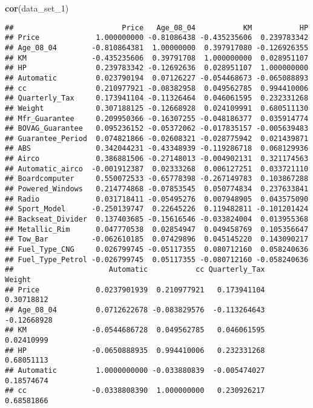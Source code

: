 \documentclass[]{article}
\newenvironment{Shaded}{\begin{snugshade}}{\end{snugshade}}
\newcommand{\DecValTok}[1]{\textcolor[rgb]{0.00,0.00,0.81}{#1}}
\newcommand{\KeywordTok}[1]{\textcolor[rgb]{0.13,0.29,0.53}{\textbf{#1}}}
\newcommand{\NormalTok}[1]{#1}
\begin{document}
\begin{Shaded}
\begin{Highlighting}[]
\KeywordTok{cor}\NormalTok{(data_set_}\DecValTok{1}\NormalTok{)}
\end{Highlighting}
\end{Shaded}

\begin{verbatim}
##                         Price   Age_08_04           KM           HP
## Price             1.000000000 -0.81086438 -0.435235606  0.239783342
## Age_08_04        -0.810864381  1.00000000  0.397917080 -0.126926355
## KM               -0.435235606  0.39791708  1.000000000  0.028951107
## HP                0.239783342 -0.12692636  0.028951107  1.000000000
## Automatic         0.023790194  0.07126227 -0.054468673 -0.065088893
## cc                0.210977921 -0.08382958  0.049562785  0.994410006
## Quarterly_Tax     0.173941104 -0.11326464  0.046061595  0.232331268
## Weight            0.307188125 -0.12668928  0.024109991  0.680511130
## Mfr_Guarantee     0.209950366 -0.16307255 -0.048186377  0.035914774
## BOVAG_Guarantee   0.095236152 -0.05372062 -0.017835157 -0.005639483
## Guarantee_Period  0.074821866 -0.02608321 -0.028775942  0.021439871
## ABS               0.342044231 -0.43348939 -0.119286718  0.068129936
## Airco             0.386881506 -0.27148013 -0.004902131  0.321174563
## Automatic_airco  -0.001912387  0.02333268  0.006127251  0.033721110
## Boardcomputer     0.550072533 -0.65778398 -0.267149783  0.103867288
## Powered_Windows   0.214774868 -0.07853545  0.050774834  0.237633841
## Radio             0.031718411 -0.05495276  0.007948905  0.043575090
## Sport_Model      -0.250139747  0.22645226  0.119482811 -0.101201424
## Backseat_Divider  0.137403685 -0.15616546 -0.033824004  0.013955368
## Metallic_Rim      0.047770538  0.02854947  0.049458769  0.105356647
## Tow_Bar          -0.062610185  0.07429896  0.045145220  0.143090217
## Fuel_Type_CNG     0.026799745 -0.05117355  0.080712160  0.058240636
## Fuel_Type_Petrol -0.026799745  0.05117355 -0.080712160 -0.058240636
##                      Automatic           cc Quarterly_Tax      Weight
## Price             0.0237901939  0.210977921   0.173941104  0.30718812
## Age_08_04         0.0712622678 -0.083829576  -0.113264643 -0.12668928
## KM               -0.0544686728  0.049562785   0.046061595  0.02410999
## HP               -0.0650888935  0.994410006   0.232331268  0.68051113
## Automatic         1.0000000000 -0.033880839  -0.005474027  0.18574674
## cc               -0.0338808390  1.000000000   0.230926217  0.68581866

\end{verbatim}
\end{document}
